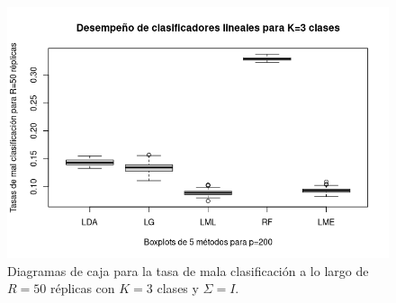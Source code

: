\documentclass{report}
\begin{document}
\begin{figure} [h]
\begin{multicols}{2}
  		\caption*{$p=100$}
  		\includegraphics[width=\linewidth]{3_clases_p200_sigma_I}\par 
  		\caption*{$p=200$}
  		
  	\end{multicols}
  	\caption{ Diagramas de caja para la tasa de mala clasificación  a lo largo de $R=50$ réplicas con $K=3$ clases y $\Sigma=I$. }
  	\label{boxk3sigmaiden}
  \end{figure}
  
\end{document}
